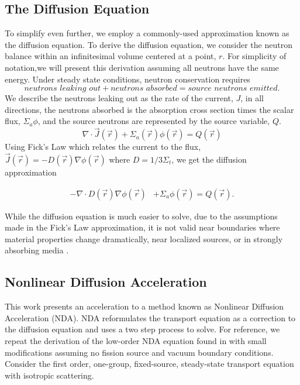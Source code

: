 \subsection{The Diffusion Equation}
To simplify even further, we employ a commonly-used approximation known as the diffusion equation. To derive the diffusion equation, we consider the neutron balance within an infinitesimal volume centered at a point, $r$. For simplicity of notation,we will present this derivation assuming all neutrons have the same energy. Under steady state conditions, neutron conservation requires
%
\begin{equation}
    \textit{neutrons leaking out} + \textit{neutrons absorbed} = \textit{source neutrons emitted}.
\end{equation}
We describe the neutrons leaking out as the rate of the current, $J$, in all directions, the neutrons absorbed is the absorption cross section times the scalar flux, $\Sigma_a\phi$, and the source neutrons are represented by the source variable, $Q$. 
\begin{equation}
    \nabla\cdot \vec{J}(\vec{r}) + \Sigma_a(\vec{r})\phi(\vec{r}) = Q(\vec{r})
\end{equation}
Using Fick's Law which relates the current to the flux, $\vec{J}(\vec{r}) = -D(\vec{r})\nabla\phi(\vec{r})$ where $D = 1/3\Sigma_t$, we get the diffusion approximation

\begin{equation}
\begin{split}
 - \nabla \cdot D(\vec{r})\nabla\phi(\vec{r}) &+ \Sigma_a \phi(\vec{r}) = Q(\vec{r}).
\end{split}
\label{eq:diffusion_fixed_source}
\end{equation}

While the diffusion equation is much easier to solve, due to the assumptions made in the Fick's Law approximation, it is not valid near boundaries where material properties change dramatically, near localized sources, or in strongly absorbing media \cite{lewis-miller}.

\subsection{Nonlinear Diffusion Acceleration}
This work presents an acceleration to a method known as Nonlinear Diffusion Acceleration (NDA). NDA reformulates the transport equation as a correction to the diffusion equation and uses a two step process to solve. For reference, we repeat the derivation of the low-order NDA equation found in \cite{morel-holo} with small modifications assuming no fission source and vacuum boundary conditions. Consider the first order, one-group, fixed-source, steady-state \sn transport equation with isotropic scattering. 

